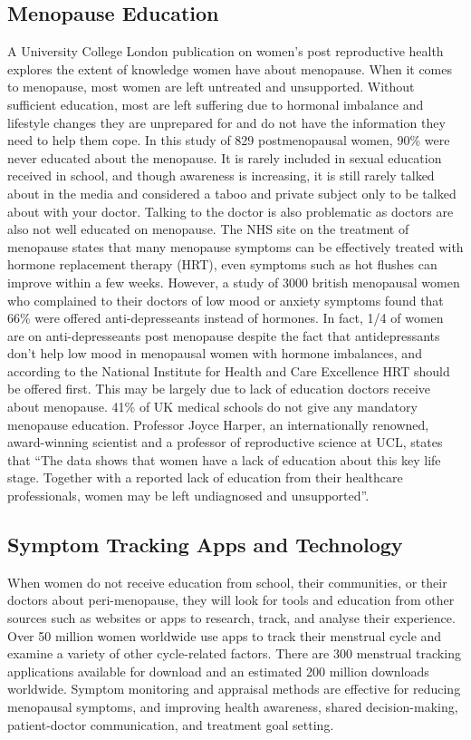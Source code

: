 \subsection{Menopause Education}
A University College London publication on women's post reproductive health\cite{Aljumah2023} explores the extent of knowledge women have about menopause. When it comes to menopause, most women are left untreated and unsupported. Without sufficient education, most are left suffering due to hormonal imbalance and lifestyle changes they are unprepared for and do not have the information they need to help them cope. In this study of 829 postmenopausal women, 90\% were never educated about the menopause. It is rarely included in sexual education received in school, and though awareness is increasing, it is still rarely talked about in the media and considered a taboo and private subject only to be talked about with your doctor\cite{Muir2022}. Talking to the doctor is also problematic as doctors are also not well educated on menopause\cite{MenopauseSupport2021}. The NHS site on the treatment of menopause\cite{NHS2022} states that many menopause symptoms can be effectively treated with hormone replacement therapy (HRT), even symptoms such as hot flushes can improve within a few weeks. However, a study of 3000 british menopausal women who complained to their doctors of low mood or anxiety symptoms found that 66\% were offered anti-depresseants instead of hormones\cite{NewsonHealth2019}. In fact, 1/4 of women are on anti-depresseants post menopause\cite{Brody2020} despite the fact that antidepressants don't help low mood in menopausal women with hormone imbalances, and according to the National Institute for Health and Care Excellence\cite{NICE2019} HRT should be offered first. This may be largely due to lack of education doctors receive about menopause. 41\% of UK medical schools do not give any mandatory menopause education\cite{MenopauseSupport2021}. Professor Joyce Harper, an internationally renowned, award-winning scientist and a professor of reproductive science at UCL, states that “The data shows that women have a lack of education about this key life stage. Together with a reported lack of education from their healthcare professionals, women may be left undiagnosed and unsupported”\cite{UCL2023}.

\subsection{Symptom Tracking Apps and Technology}
When women do not receive education from school, their communities, or their doctors about peri-menopause, they will look for tools and education from other sources such as websites or apps to research, track, and analyse their experience. Over 50 million women worldwide use apps to track their menstrual cycle and examine a variety of other cycle-related factors\cite{Kelly2023}. There are 300 menstrual tracking applications available for download and an estimated 200 million downloads worldwide\cite{Eschler2019}. Symptom monitoring and appraisal methods are effective for reducing menopausal symptoms, and improving health awareness, shared decision-making, patient-doctor communication, and treatment goal setting\cite{Andrews2021}. 

